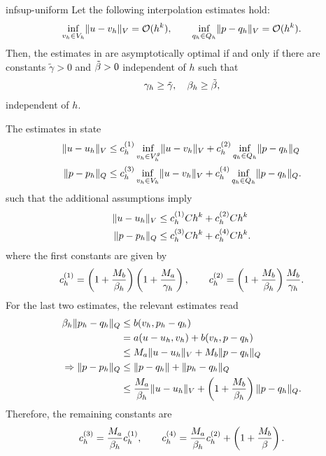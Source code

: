 \begin{Problem}{infsup-uniform}
  Let the following interpolation estimates hold:
  \begin{gather}
    \inf_{v_h\in V_h}\lVert u-v_h\rVert_V = \mathcal O(h^k),
    \qquad
    \inf_{q_h\in Q_h}\lVert p-q_h\rVert_V = \mathcal O(h^k).
  \end{gather}
  Then, the estimates in 
  are asymptotically optimal if and only if there are
  constants $\tilde \gamma>0$ and $\tilde {\beta}>0$ independent of
  $h$ such that
  \begin{gather}
    \label{eq:galerkin:14}
    \gamma_h\ge \tilde\gamma,\quad\beta_h\ge\tilde{\beta},
  \end{gather}
  independent of $h$.
\begin{solution}
  The estimates in  state
  \begin{align}
    \lVert u-u_h\rVert_V &\le c_h^{(1)} \inf_{v_h\in V_h^g}\lVert u-v_h\rVert_V
	      + c_h^{(2)} \inf_{q_h\in Q_h}\lVert p-q_h\rVert_Q \\
    \lVert p-p_h\rVert_Q &\le c_h^{(3)} \inf_{v_h\in V_h}\lVert u-v_h\rVert_V
	      + c_h^{(4)} \inf_{q_h\in Q_h}\lVert p-q_h\rVert_Q.
  \end{align}
  such that the additional assumptions imply
  \begin{align}
    \lVert u-u_h\rVert_V &\le c_h^{(1)} C h^k + c_h^{(2)} C h^k \\
    \lVert p-p_h\rVert_Q &\le c_h^{(3)} C h^k + c_h^{(4)} C h^k.
  \end{align}
    where the first constants are given by
  \begin{align}
    c_h^{(1)} = \left(1+\frac{M_b}{\beta_h}\right)
    \left(1+\frac{M_a}{\gamma_h}\right),
    \qquad
    c_h^{(2)} = \left(1+\frac{M_b}{\beta_h}\right)
    \frac{M_b}{\gamma_h}.
  \end{align}
  For the last two estimates, the relevant estimates read
  \begin{align}
    \beta_h \lVert p_h-q_h\rVert_Q
    &\le b(v_h,p_h-q_h)\\
    & = a(u-u_h, v_h) + b(v_h, p-q_h)\\
    &\le M_a \lVert u-u_h\rVert_V + M_b \lVert p-q_h\rVert_Q\\
    \Rightarrow \lVert p-p_h\rVert_Q
    &\le \lVert p-q_h\rVert + \lVert p_h-q_h\rVert_Q \\
    &\le \frac{M_a}{\beta_h} \lVert u-u_h\rVert_V + \left(1+\frac{M_b}{\beta_h}\right) \lVert p-q_h\rVert_Q.
  \end{align}
  Therefore, the remaining constants are
  \begin{align}
    c_h^{(3)} = \frac{M_a}{\beta_h}c_h^{(1)}, \qquad
    c_h^{(4)} = \frac{M_a}{\beta_h}c_h^{(2)}+\left(1+\frac{M_b}{\beta}\right).
  \end{align}
\end{solution}
\end{Problem}

